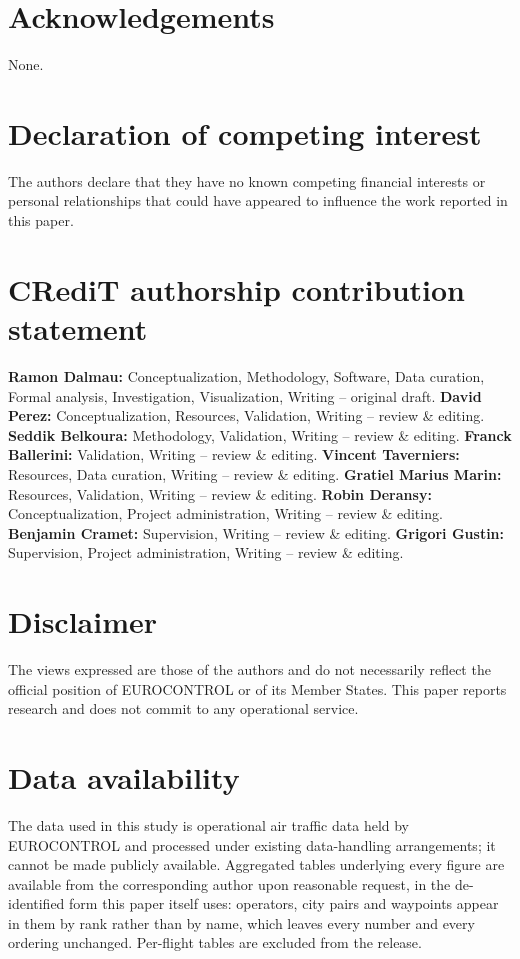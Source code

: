 \documentclass[preprint,authoryear,12pt]{elsarticle}
\begin{document}
\section*{Acknowledgements}
None.

\section*{Declaration of competing interest}
The authors declare that they have no known competing financial
interests or personal relationships that could have appeared to
influence the work reported in this paper.

\section*{CRediT authorship contribution statement}
\textbf{Ramon Dalmau:} Conceptualization, Methodology, Software, Data
curation, Formal analysis, Investigation, Visualization, Writing --
original draft. \textbf{David Perez:} Conceptualization, Resources,
Validation, Writing -- review \& editing. \textbf{Seddik Belkoura:}
Methodology, Validation, Writing -- review \& editing.
\textbf{Franck Ballerini:} Validation, Writing -- review \& editing.
\textbf{Vincent Taverniers:} Resources, Data curation, Writing --
review \& editing. \textbf{Gratiel Marius Marin:} Resources,
Validation, Writing -- review \& editing. \textbf{Robin Deransy:} Conceptualization, Project
administration, Writing -- review \& editing. \textbf{Benjamin
Cramet:} Supervision, Writing -- review \& editing. \textbf{Grigori
Gustin:} Supervision, Project administration, Writing -- review \&
editing.

\section*{Disclaimer}
The views expressed are those of the authors and do not necessarily
reflect the official position of EUROCONTROL or of its Member States.
This paper reports research and does not commit to any operational
service.

\section*{Data availability}
The data used in this study is operational air traffic data held by
EUROCONTROL and processed under existing data-handling arrangements; it
cannot be made publicly available. Aggregated tables underlying every
figure are available from the corresponding author upon reasonable
request, in the de-identified form this paper itself uses: operators,
city pairs and waypoints appear in them by rank rather than by name,
which leaves every number and every ordering unchanged. Per-flight tables are excluded from the release.
\end{document}
